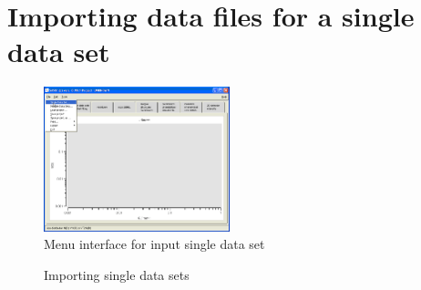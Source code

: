 \section{Importing data files for a single data set}
\begin{figure}[htb]
\includegraphics[width=0.48\textwidth]{QTloadingSingleDS.png}
\caption{Menu interface for input single data set}
\label{fig:QTloadingSingleDS}
\end{figure}

\begin{figure}[htb]
\centering
\caption{Importing single data sets} \label{fig:QTNewFileDS}
\end{figure}

